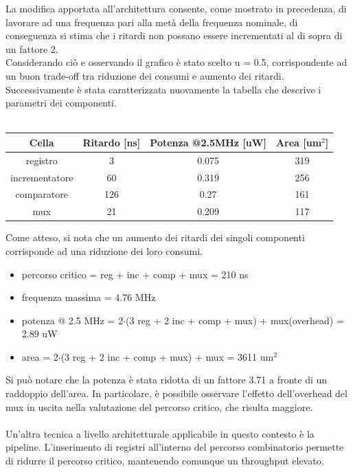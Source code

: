 \documentclass[11pt,  english, makeidx, a4paper, titlepage, oneside]{book}
\begin{document}
La modifica apportata all'architettura consente, come mostrato in precedenza, di lavorare ad una frequenza pari alla metà della frequenza nominale, di conseguenza si stima che i ritardi non possano essere incrementati al di sopra di un fattore 2.
\\
Considerando ciò e osservando il grafico è stato scelto u = 0.5, corrispondente ad un buon trade-off tra riduzione dei consumi e aumento dei ritardi. Successivamente è stata caratterizzata nuovamente la tabella che descrive i parametri dei componenti.
\\\\
\begin{center}
	\begin{tabular}{|c|c|c|c|}
	\hline
	Cella & Ritardo [ns] & Potenza @2.5MHz [uW] & Area [um$^2$] \\
	\hline
	 registro & 3 & 0.075 & 319 \\
	\hline
	 incrementatore & 60 & 0.319 & 256 \\
	\hline
	 comparatore & 126 & 0.27 & 161 \\
	\hline
	 mux & 21 & 0.209 & 117 \\
	\hline
	\end{tabular}	
\end{center}
\vspace{0.3cm}
Come atteso, si nota che un aumento dei ritardi dei singoli componenti corrisponde ad una riduzione dei loro consumi.
\begin{itemize}
\item percorso critico = reg + inc + comp + mux = 210 ns
\item frequenza massima = 4.76 MHz
\item potenza @ 2.5 MHz = 2$\cdot$(3 reg + 2 inc + comp + mux) + mux(overhead) = 2.89 uW
\item area = 2$\cdot$(3 reg + 2 inc + comp + mux) + mux = 3611 um$^2$
\end{itemize}
\vspace{0.3cm}
Si può notare che la potenza è stata ridotta di un fattore 3.71 a fronte di un raddoppio dell'area. In particolare, è possibile osservare l'effetto dell'overhead del mux in uscita nella valutazione del percorso critico, che risulta maggiore.
\\\\
Un'altra tecnica a livello architetturale applicabile in questo contesto è la pipeline. L'inserimento di registri all'interno del percorso combinatorio permette di ridurre il percorso critico, mantenendo comunque un throughput elevato.
\end{document}
